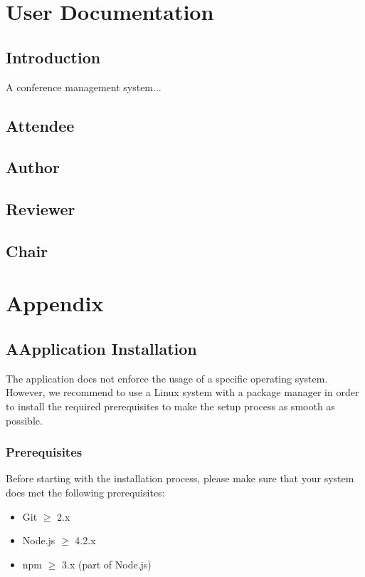 \documentclass[nochapterpage,nopartpage,noheadingspace,numbersubsubsec,bigchapter,colorback,accentcolor=tud9c,10pt]{tudreport}
\begin{document}
\part{User Documentation}
\label{part:user}

  \chapter{Introduction}
  \label{ch:user:intro}

    A conference management system...

  \chapter{Attendee}
  \chapter{Author}
  \chapter{Reviewer}
  \chapter{Chair}



\part{Appendix}
\label{part:appendix}

  \chapter*{A\quad Application Installation}
  \label{ch:appendix:setup}

    The application does not enforce the usage of a specific operating system. However, we recommend to use a Linux system with a package manager in order to install the required prerequisites to make the setup process as smooth as possible.

  \section*{Prerequisites}
  \label{sec:appendix:setup:prerequisites}

    Before starting with the installation process, please make sure that your system does met the following prerequisites:
        \begin{multicols}{2}
        \begin{itemize}
            \item Git $\ge$ 2.x
            \item Node.js $\ge$ 4.2.x
            \item npm $\ge$ 3.x (part of Node.js)
        \end{itemize}
        \end{multicols}
\end{document}
